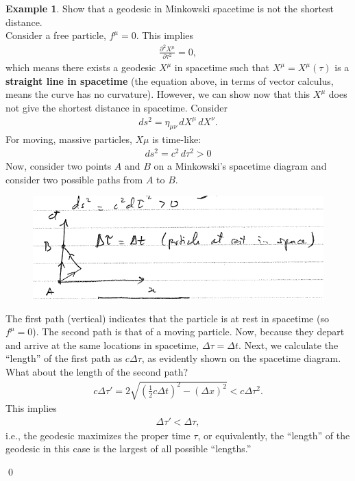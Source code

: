 \documentclass{book}
\theoremstyle{definition}
\newtheorem{exmp}{Example}[section]
\begin{document}
\begin{exmp}
	Show that a geodesic in Minkowski spacetime is not the shortest distance. \\
	
	Consider a free particle, $f^\mu = 0$. This implies
	\begin{align*}
	\frac{\partial^2 X^\mu}{\partial \tau^2} = 0,
	\end{align*}
	which means there exists a geodesic $X^\mu$ in spacetime such that $X^\mu = X^\mu(\tau)$ is a \textbf{straight line in spacetime} (the equation above, in terms of vector calculus, means the curve has no curvature). However, we can show now that this $X^\mu$ does not give the shortest distance in spacetime. Consider
	\begin{align*}
	ds^2 = \eta_{\mu\nu}\,dX^\mu\,dX^\nu.
	\end{align*}
	For moving, massive particles, $X\mu$ is time-like: 
	\begin{align*}
	ds^2 = c^2\,d\tau^2 > 0
	\end{align*}
	Now, consider two points $A$ and $B$ on a Minkowski's spacetime diagram and consider two possible paths from $A$ to $B$.
	\begin{figure}[!htb]
		\centering
		\includegraphics[scale=0.6]{timelike}
	\end{figure}
	The first path (vertical) indicates that the particle is at rest in spacetime (so $f^\mu = 0$). The second path is that of a moving particle. Now, because they depart and arrive at the same locations in spacetime, $\Delta\tau = \Delta t$. Next, we calculate the ``length'' of the first path as $c\Delta \tau$, as evidently shown on the spacetime diagram. What about the length of the second path?
	\begin{align*}
	c\Delta \tau' = 2\sqrt{\left( \frac{1}{2}c\Delta t \right)^2  - \left( \Delta x \right)^2  } < c\Delta\tau^2.
	\end{align*}
	This implies
	\begin{align*}
	\Delta \tau' < \Delta \tau,
	\end{align*}
	i.e., the geodesic maximizes the proper time $\tau$, or equivalently, the ``length'' of the geodesic in this case is the largest of all possible ``lengths.'' 
\end{exmp}\qed 
\end{document}
